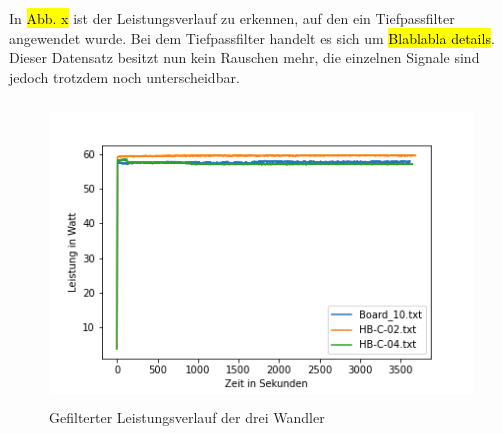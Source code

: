 In \hl{Abb. x} ist der Leistungsverlauf zu erkennen, auf den ein Tiefpassfilter angewendet wurde. Bei dem Tiefpassfilter handelt es sich um \hl{Blablabla details}. Dieser Datensatz besitzt nun kein Rauschen mehr, die einzelnen Signale sind jedoch trotzdem noch unterscheidbar. 


\begin{figure}[H]
    \centering
    \includegraphics[height= 8cm, width = \textwidth]{Pictures/3_Board_Leistung_Filtered.png}
    \caption{Gefilterter Leistungsverlauf der drei Wandler}
\end{figure}



